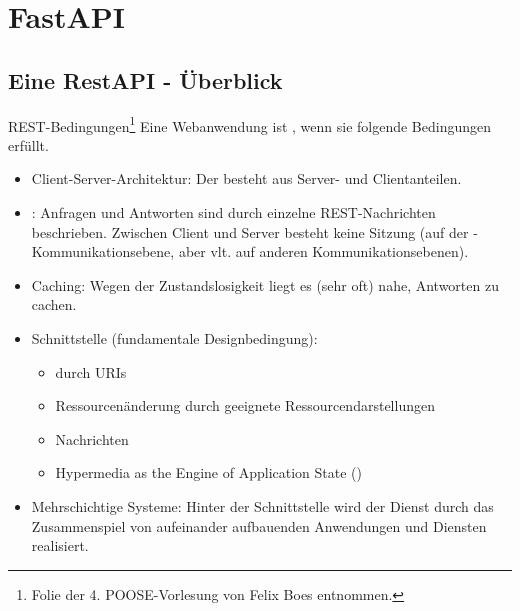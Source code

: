 \documentclass[12pt, aspectratio=169, usepdftitle=false]{beamer}
\begin{document}
\framecardfragen

\section{FastAPI}

\subsection{Eine RestAPI - Überblick}

\begin{frame}{REST-Bedingungen\footnote{Folie der 4. POOSE-Vorlesung von Felix Boes entnommen.}}
    \vspace{-0.3ex}
    Eine Webanwendung ist , wenn sie folgende Bedingungen erfüllt. \pause
    \begin{itemize}
      \item Client-Server-Architektur: Der  besteht aus Server- und Clientanteilen. \pause
      \item {}: Anfragen und Antworten sind durch einzelne REST-Nachrichten  beschrieben. \pause
        Zwischen Client und Server besteht keine Sitzung (auf der -Kommunikationsebene, aber vlt. auf anderen Kommunikationsebenen). \pause
      \item Caching: Wegen der Zustandslosigkeit liegt es (sehr oft) nahe, Antworten zu cachen. \pause
      \item {} Schnittstelle (fundamentale Designbedingung):
        \begin{itemize}
          \item {} durch URIs \pause
          \item Ressourcenänderung durch geeignete Ressourcendarstellungen \pause
          \item {} Nachrichten \pause
          \item Hypermedia as the Engine of Application State () \pause
        \end{itemize}
      \item Mehrschichtige Systeme: Hinter der Schnittstelle wird der Dienst durch das Zusammenspiel von aufeinander aufbauenden Anwendungen und Diensten realisiert.
    \end{itemize}
  \end{frame}
\end{document}
